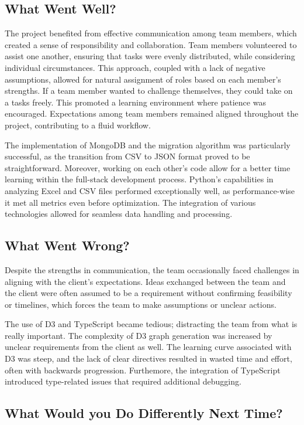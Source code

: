 \documentclass{article}
\begin{document}
\subsection{What Went Well?}

The project benefited from effective communication among team members, which
created a sense of responsibility and collaboration. Team members volunteered to
assist one another, ensuring that tasks were evenly distributed, while
considering individual circumstances. This approach, coupled with a lack of
negative assumptions, allowed for natural assignment of roles based on each
member's strengths. If a team member wanted to challenge themselves, they could
take on a tasks freely. This promoted a learning environment where patience was
encouraged. Expectations among team members remained aligned throughout the
project, contributing to a fluid workflow.

The implementation of MongoDB and the migration algorithm was particularly
successful, as the transition from CSV to JSON format proved to be
straightforward. Moreover, working on each other's code allow for a better time
learning within the full-stack development process. Python's capabilities in
analyzing Excel and CSV files performed exceptionally well, as performance-wise
it met all metrics even before optimization. The integration of various
technologies allowed for seamless data handling and processing.

\subsection{What Went Wrong?}

Despite the strengths in communication, the team occasionally faced challenges
in aligning with the client's expectations. Ideas exchanged between the team and
the client were often assumed to be a requirement without confirming feasibility
or  timelines, which forces the team to make assumptions or unclear actions. 

The use of D3 and TypeScript became tedious; distracting the team from what is
really important. The complexity of D3 graph generation was increased by unclear
requirements from the client as well. The learning curve associated with D3 was
steep, and the lack of clear directives resulted in wasted time and effort,
often with backwards progression. Furthemore, the integration of TypeScript
introduced type-related issues that required additional debugging. 

\subsection{What Would you Do Differently Next Time?}
\end{document}
